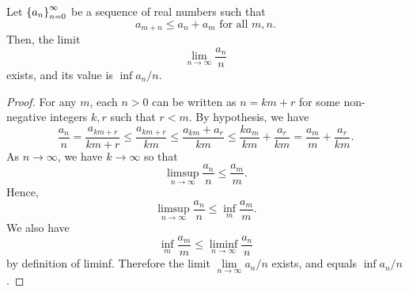 \documentclass[10pt,twoside,draft]{book}
\begin{document}
\begin{lemma}
  \citep[Theorem 4.9]{walters}
  Let $\left \{ a_n \right \}^{\infty}_{n = 0}$ be a sequence of real numbers such that 
  \begin{equation*}
    a_{m+n} \leq a_n + a_m \mbox{ for all } m,n.
  \end{equation*}
  Then, the limit
  \begin{equation*}
    \lim\limits_{n \to \infty} \frac{a_n}{n} 
  \end{equation*}
  exists, and its value is $\inf a_n / n$.
  \begin{proof}
    For any $m$, each $n > 0$ can be written as $n = km + r$ for some non-negative integers $k,r$ such that $r < m$.
    By hypothesis, we have 
    \begin{equation*}
      \frac{a_n}{n}
      = \frac{a_{km + r}}{km + r}
      \leq \frac{a_{km + r}}{km}
      \leq \frac{a_{km} + a_r}{km}
      \leq \frac{k a_{m}}{km} + \frac{a_r}{km}
      = \frac{a_{m}}{m} + \frac{a_r}{km}.
    \end{equation*}
    As $n \to \infty$, we have $k \to \infty$ so that
    \begin{equation*}
      \limsup\limits_{n \to \infty} \frac{a_n}{n} \leq \frac{a_m}{m}.
    \end{equation*}
    Hence,
    \begin{equation*}
      \limsup\limits_{n \to \infty} \frac{a_n}{n} \leq \inf\limits_m \frac{a_m}{m}.
    \end{equation*}
    We also have
    \begin{equation*}
      \inf\limits_{m} \frac{a_m}{m} \leq \liminf\limits_{n \to \infty} \frac{a_n}{n}
    \end{equation*}
    by definition of liminf.
    Therefore the limit $\lim\limits_{n \to \infty} a_n/n$ exists, and equals $\inf a_n/n$.
  \end{proof}
\end{lemma}
\end{document}
